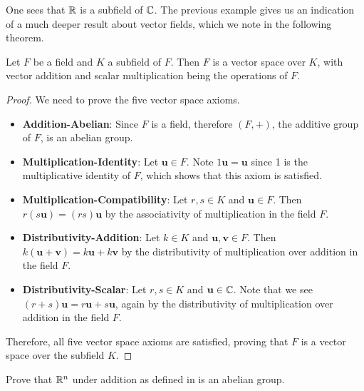 One sees that $\mathbb{R}$ is a subfield of $\mathbb{C}$. The previous example gives us an indication of a much deeper result about vector fields, which we note in the following theorem.

\begin{theorem}\label{thrm-field-is-vector-space}
    Let $F$ be a field and $K$ a subfield of $F$. Then $F$ is a vector space over $K$, with vector addition and scalar multiplication being the operations of $F$.
\end{theorem}
\begin{proof}
    We need to prove the five vector space axioms.
    \begin{itemize}
        \item \textbf{Addition-Abelian}: Since $F$ is a field, therefore $(F, +)$, the additive group of $F$, is an abelian group.
        
        \item \textbf{Multiplication-Identity}: Let $\textbf{u} \in F$. Note $1\textbf{u} = \textbf{u}$ since 1 is the multiplicative identity of $F$, which shows that this axiom is satisfied.

        \item \textbf{Multiplication-Compatibility}: Let $r, s \in K$ and $\textbf{u} \in F$. Then $r(s\textbf{u}) = (rs)\textbf{u}$ by the associativity of multiplication in the field $F$.
        
        \item \textbf{Distributivity-Addition}: Let $k \in K$ and $\textbf{u}, \textbf{v} \in F$. Then $k(\textbf{u} + \textbf{v}) = k\textbf{u} + k\textbf{v}$ by the distributivity of multiplication over addition in the field $F$.
        
        \item \textbf{Distributivity-Scalar}: Let $r, s \in K$ and $\textbf{u} \in \mathbb{C}$. Note that we see $(r+s)\textbf{u} = r\textbf{u} + s\textbf{u}$, again by the distributivity of multiplication over addition in the field $F$.
    \end{itemize}

    Therefore, all five vector space axioms are satisfied, proving that $F$ is a vector space over the subfield $K$.
\end{proof}

\begin{exercise}\label{exercise-R^n-is-abelian-group}
    Prove that $\mathbb{R}^n$ under addition as defined in  is an abelian group.
\end{exercise}

